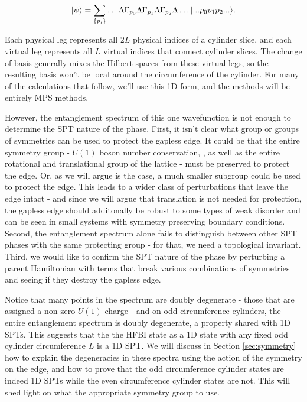 $$
\vert \psi \rangle = \sum\limits_{\{p_i\}} \ldots \Lambda \Gamma_{p_0} \Lambda \Gamma_{p_1} \Lambda \Gamma_{p_2} \Lambda \ldots \vert ... p_0 p_1 p_2 ... \rangle.
$$

Each physical leg represents all $2L$ physical indices of a cylinder slice,
and each virtual leg represents all $L$ virtual indices that connect cylinder
slices. The change of basis generally mixes the Hilbert spaces from these
virtual legs, so the resulting basis won't be local around the circumference
of the cylinder.
For many of the calculations that follow, we'll use this 1D form, and the
methods will be entirely MPS methods.

However, the entanglement spectrum of this one wavefunction is not enough to
determine the SPT nature of the phase. First, it isn't clear what group or
groups of symmetries can be used to protect the gapless edge. It could be that
the entire symmetry group - $U(1)$ boson number conservation, , as well as the entire rotational and translational group
of the lattice - must be preserved to protect the edge. Or, as we will argue
is the case, a much smaller subgroup could be used to protect the edge. This
leads to a wider class of perturbations that leave the edge intact - and since
we will argue that translation is not needed for protection, the gapless edge should additonally be robust to some types of weak disorder and can be seen in
small systems with symmetry preserving boundary conditions. Second, the
entanglement spectrum alone fails to distinguish between other SPT phases with
the same protecting group - for that, we need a topological invariant. Third,
we would like to confirm the SPT nature of the phase by perturbing a parent
Hamiltonian with terms that break various combinations of symmetries and
seeing if they destroy the gapless edge.


Notice that many points in the spectrum are doubly degenerate - those that are
assigned a non-zero $U(1)$ charge - and on odd circumference cylinders, the
entire entanglement spectrum is doubly degenerate, a property shared with 1D SPTs. This suggests that the the HFBI state as a 1D state with any
fixed odd cylinder circumference $L$ is a 1D SPT. We will discuss in
Section \ref{sec:symmetry} how to explain the degeneracies in these spectra
using the action of the symmetry on the edge, and how to prove that the odd
circumference cylinder states are indeed 1D SPTs while the even circumference
cylinder states are not. This will shed light on what the appropriate symmetry
group to use.

